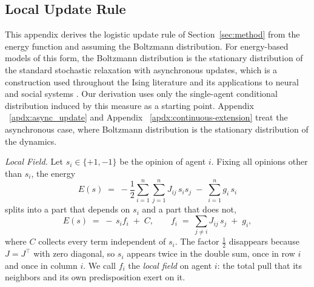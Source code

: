 \subsection{Local Update Rule}\label{apdx:discrete-updates}

This appendix derives the logistic update rule of Section~\ref{sec:method} from the energy function and assuming the Boltzmann distribution. For energy-based models of this form, the Boltzmann distribution is the stationary distribution of the standard stochastic relaxation with asynchronous updates, which is a construction used throughout the Ising literature and its applications to neural and social systems
\citep{glauber1963,hopfield1982neural,brock2001,castellano2009}. Our derivation uses only the single-agent conditional distribution induced by this measure as a starting point. Appendix ~\ref{apdx:async_update} and Appendix ~\ref{apdx:continuous-extension} treat the asynchronous case, where Boltzmann distribution is the stationary distribution of the dynamics.


\textit{Local Field.} Let $s_{i} \in \{+1,-1\}$ be the opinion of agent $i$. Fixing all opinions other than $s_i$, the energy
\[
E(s) \;=\; -\frac{1}{2}\sum_{i=1}^n \sum_{j=1}^n J_{ij}\,s_i s_j \;-\; \sum_{i=1}^n g_i\,s_i
\]
splits into a part that depends on $s_i$ and a part that does not,
\[
E(s) \;=\; -\,s_i f_i \;+\; C,
\qquad
f_i \;=\; \sum_{j\neq i} J_{ij}\,s_j \;+\; g_i ,
\]
where $C$ collects every term independent of $s_i$. The factor $\tfrac12$ disappears because
$J = J^{\top}$ with zero diagonal, so $s_i$ appears twice in the double sum, once in row $i$
and once in column $i$. We call $f_i$ the \emph{local field} on agent $i$: the total pull that
its neighbors and its own predisposition exert on it.


